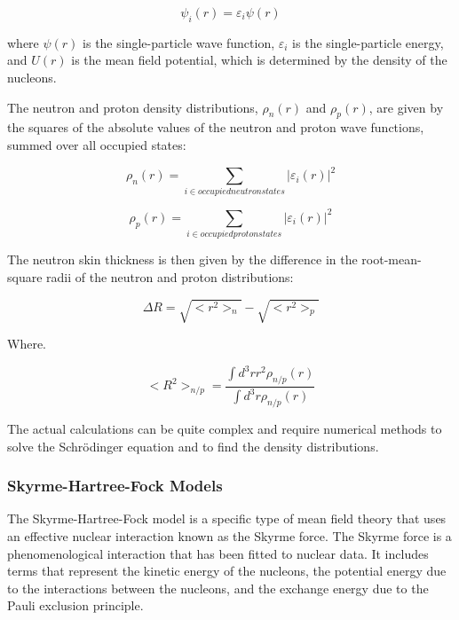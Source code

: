 \begin{equation}
    [-\frac{\hbar^2}{2m}\nabla^2 + U(r)]\psi_i(r) = \varepsilon_i\psi(r)
\end{equation}

where $\psi(r)$ is the single-particle wave function, $\varepsilon_i$ is the single-particle energy, and $U(r)$ is the mean field potential, which is determined by the density of the nucleons.

The neutron and proton density distributions, $\rho_n(r)$ and $\rho_p(r)$, are given by the squares of the absolute values of the neutron and proton wave functions, summed over all occupied states:

\begin{equation}
    \rho_n(r) = \sum_{i\in occupied neutron states}|\varepsilon_i(r)|^2
\end{equation}

\begin{equation}
    \rho_p(r) = \sum_{i\in occupied proton states}|\varepsilon_i(r)|^2
\end{equation}


The neutron skin thickness is then given by the difference in the root-mean-square radii of the neutron and proton distributions:

\begin{equation}
    \Delta{R} = \sqrt{<r^2>_n} - \sqrt{<r^2>_p}
\end{equation}

Where. 

\begin{equation}
    <R^2>_{n/p} = \frac{\int{d^3rr^2\rho_{n/p}(r)}}{\int{d^3r\rho_{n/p}(r)}}
\end{equation}

The actual calculations can be quite complex and require numerical methods to solve the Schrödinger equation and to find the density distributions.


\subsubsection{Skyrme-Hartree-Fock Models}

The Skyrme-Hartree-Fock model is a specific type of mean field theory that uses an effective nuclear interaction known as the Skyrme force. The Skyrme force is a phenomenological interaction that has been fitted to nuclear data. It includes terms that represent the kinetic energy of the nucleons, the potential energy due to the interactions between the nucleons, and the exchange energy due to the Pauli exclusion principle.


